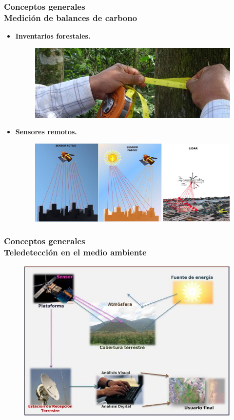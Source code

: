 \documentclass[xcolor=table]{beamer}
\begin{document}
	
	
	\begin{frame}
		\frametitle{Conceptos generales\\Medici\'on de balances de carbono}		
		\begin{itemize}
			\item \textbf{Inventarios forestales.} 
			\begin{figure}[h!]
				\centering
				\includegraphics[width=0.7\linewidth]{imagenes/inventario-forestal}
				\label{fig:inventario-forestal}
			\end{figure}
			
			\item \textbf{Sensores remotos.} 
			\begin{figure}[h!]
				\centering
				\includegraphics[width=0.7\linewidth]{imagenes/sensores}
				
				\label{fig:sensores}
			\end{figure}
			
		\end{itemize}
	\end{frame}
	
	
	\begin{frame}
		\frametitle{Conceptos generales\\Teledetecci\'on en el medio ambiente}		
		\begin{figure}[H]
			\centering
			\includegraphics[width=0.7	\textwidth]{imagenes/cap3/teledeteccion.png}
			\label{fig:tele}
		\end{figure}
	\end{frame}
	
\end{document}
